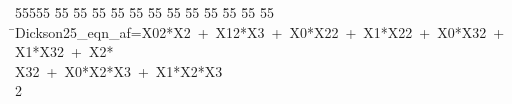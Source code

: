 %
%
\begin{tabbing}
55555 \= 55 \= 55 \= 55 \= 55 \= 55 \= 55 \= 55 \= 55 \= 55 \= 55 \= 55 \= 55 \= \>Dickson25\_eqn\_af=X02*X2\ +\ X12*X3\ +\ X0*X22\ +\ X1*X22\ +\ X0*X32\ +\ X1*X32\ +\ X2*\\[0pt]
\>X32\ +\ X0*X2*X3\ +\ X1*X2*X3\\[0pt]
2\>\end{tabbing}
